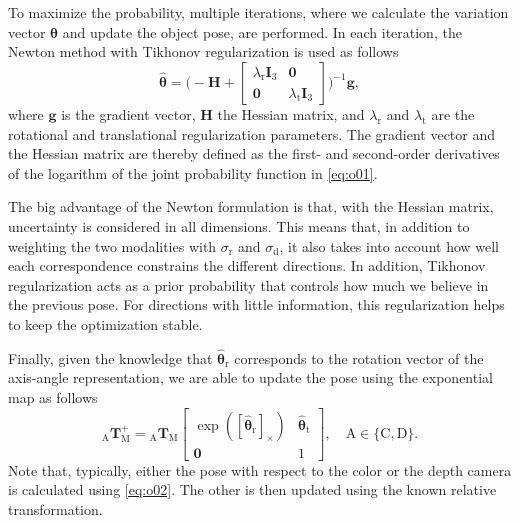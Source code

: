 \documentclass[10pt,twocolumn,letterpaper]{article}
\begin{document}
To maximize the probability, multiple iterations, where we calculate the variation vector $\pmb{\hat{\theta}}$ and update the object pose, are performed.
In each iteration, the Newton method with Tikhonov regularization is used as follows
\begin{equation} \label{eq:o00}
	\pmb{\hat{\theta}} = \bigg(-\pmb{H} + 
	\begin{bmatrix}
		\lambda_\textrm{r} \pmb{I}_3 & \pmb{0}\\
		\pmb{0} & \lambda_\textrm{t} \pmb{I}_3
	\end{bmatrix}
	\bigg)^{-1}\pmb{g},
\end{equation}
where $\pmb{g}$ is the gradient vector, $\pmb{H}$ the Hessian matrix, and $\lambda_\textrm{r}$ and $\lambda_\textrm{t}$ are the rotational and translational regularization parameters.
The gradient vector and the Hessian matrix are thereby defined as the first- and second-order derivatives of the logarithm of the joint probability function in \cref{eq:o01}.

The big advantage of the Newton formulation is that, with the Hessian matrix, uncertainty is considered in all dimensions.
This means that, in addition to weighting the two modalities with $\sigma_\textrm{r}$ and $\sigma_\textrm{d}$, it also takes into account how well each correspondence constrains the different directions.
In addition, Tikhonov regularization acts as a prior probability that controls how much we believe in the previous pose.
For directions with little information, this regularization helps to keep the optimization stable.

Finally, given the knowledge that $\pmb{\hat{\theta}}_\textrm{r}$ corresponds to the rotation vector of the axis-angle representation, we are able to update the pose using the exponential map as follows 
\begin{equation} \label{eq:o02}
	_\textrm{A}\pmb{T}_\textrm{M}^+ =
	{}_\textrm{A}\pmb{T}_\textrm{M}
	\begin{bmatrix}
		\exp([\pmb{\hat{\theta}}_\textrm{r}]_\times) & \pmb{\hat{\theta}}_\textrm{t} \\ \pmb{0} & 1
	\end{bmatrix}
 	, \quad \textrm{A}\in\{\textrm{C}, \textrm{D}\}.
\end{equation}
Note that, typically, either the pose with respect to the color or the depth camera is calculated using \cref{eq:o02}.
The other is then updated using the known relative transformation.
\end{document}
